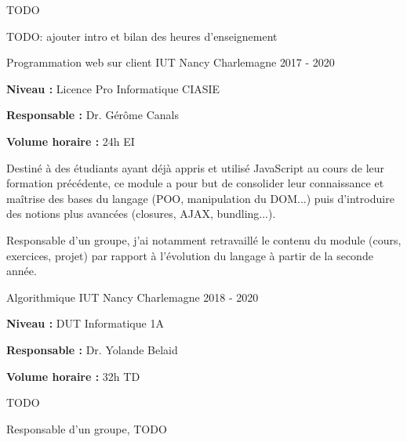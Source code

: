 \documentclass[12pt, a4paper]{awesome-cv}
\begin{document}

TODO


TODO: ajouter intro et bilan des heures d'enseignement

\begin{cventries}

  \cventry
  {Programmation web sur client} %
  {IUT Nancy Charlemagne} %
  {} %
  {2017 - 2020} %
  {
    \begin{cvitems}
      \item {\textbf{Niveau : } Licence Pro Informatique CIASIE}
      \item {\textbf{Responsable : } Dr. Gérôme Canals}
      \item {\textbf{Volume horaire : } 24h EI}
    \end{cvitems}
  }

  \begin{cvparagraph}
    Destiné à des étudiants ayant déjà appris et utilisé JavaScript au cours de leur formation précédente, ce module a pour but de consolider leur connaissance et maîtrise des bases du langage (POO, manipulation du DOM...) puis d'introduire des notions plus avancées (closures, AJAX, bundling...).
  \end{cvparagraph}

  \begin{cvparagraph}
    Responsable d'un groupe, j'ai notamment retravaillé le contenu du module (cours, exercices, projet) par rapport à l'évolution du langage à partir de la seconde année.
  \end{cvparagraph}

  \cventry
  {Algorithmique} %
  {IUT Nancy Charlemagne} %
  {} %
  {2018 - 2020} %
  {
    \begin{cvitems}
      \item {\textbf{Niveau : } DUT Informatique 1A}
      \item {\textbf{Responsable : } Dr. Yolande Belaid}
      \item {\textbf{Volume horaire : } 32h TD}
    \end{cvitems}
  }

  \begin{cvparagraph}
    TODO
  \end{cvparagraph}

  \begin{cvparagraph}
    Responsable d'un groupe, TODO
  \end{cvparagraph}


\end{cventries}
\end{document}
